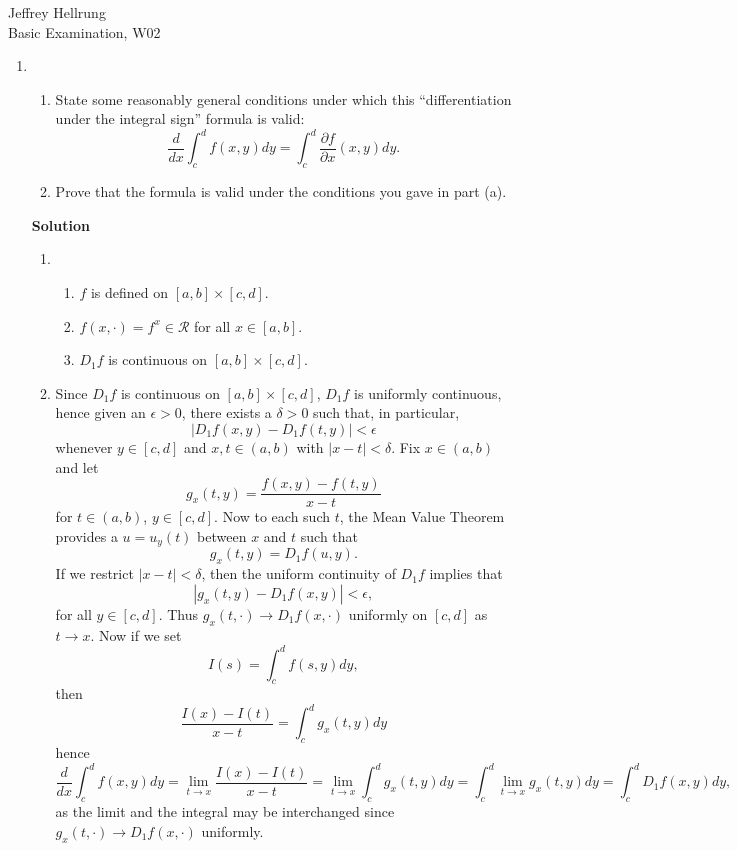 \documentclass{article}
\begin{document}
\begin{flushright}
Jeffrey Hellrung \\
Basic Examination, W02 \\
\end{flushright}


\begin{enumerate}

\item

\begin{enumerate}
\item State some reasonably general conditions under which this ``differentiation under the integral sign'' formula is valid:
\[\frac{d}{dx} \int_c^d f(x,y) dy = \int_c^d \frac{\partial f}{\partial x}(x,y) dy.\]

\item Prove that the formula is valid under the conditions you gave in part (a).

\end{enumerate}

{\bf Solution}

\begin{enumerate}
\item
\begin{enumerate}
\item \(f\) is defined on \([a,b] \times [c,d]\).
\item \(f(x,\cdot) = f^x \in \mathcal{R}\) for all \(x \in [a,b]\).
\item \(D_1f\) is continuous on \([a,b] \times [c,d]\).
\end{enumerate}

\item Since \(D_1f\) is continuous on \([a,b] \times [c,d]\), \(D_1f\) is uniformly continuous, hence given an \(\epsilon > 0\), there exists a \(\delta > 0\) such that, in particular,
\[\left| D_1f(x,y) - D_1f(t,y) \right| < \epsilon\]
whenever \(y \in [c,d]\) and \(x,t \in (a,b)\) with \(|x - t| < \delta\).  Fix \(x \in (a,b)\) and let
\[g_x(t,y) = \frac{f(x,y) - f(t,y)}{x - t}\]
for \(t \in (a,b)\), \(y \in [c,d]\).  Now to each such \(t\), the Mean Value Theorem provides a \(u = u_y(t)\) between \(x\) and \(t\) such that
\[g_x(t,y) = D_1f(u,y).\]
If we restrict \(|x - t| < \delta\), then the uniform continuity of \(D_1f\) implies that
\[\left| g_x(t,y) - D_1f(x,y) \right| < \epsilon,\]
for all \(y \in [c,d]\).  Thus \(g_x(t,\cdot) \to D_1f(x,\cdot)\) uniformly on \([c,d]\) as \(t \to x\).  Now if we set
\[I(s) = \int_c^d f(s,y) dy,\]
then
\[\frac{I(x) - I(t)}{x - t} = \int_c^d g_x(t,y) dy\]
hence
\[\frac{d}{dx} \int_c^d f(x,y) dy
  = \lim_{t \to x} \frac{I(x) - I(t)}{x - t}
  = \lim_{t \to x} \int_c^d g_x(t,y) dy
  = \int_c^d \lim_{t \to x} g_x(t,y) dy
  = \int_c^d D_1f(x,y) dy,\]
as the limit and the integral may be interchanged since \(g_x(t,\cdot) \to D_1f(x,\cdot)\) uniformly.


\end{enumerate}
\end{enumerate}
\end{document}
